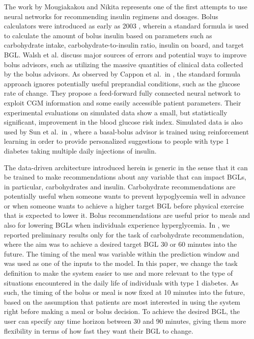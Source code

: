 \documentclass[graybox]{svmult}
\begin{document}

The work by Mougiakakou and Nikita \cite{stavroula:dtt} represents one of the first attempts to use neural networks for recommending insulin regimens and dosages. Bolus calculators were introduced as early as 2003 \cite{zisser:dtt08}, wherein a standard formula is used to calculate the amount of bolus insulin based on parameters such as carbohydrate intake, carbohydrate-to-insulin ratio, insulin on board, and target BGL. Walsh et al. \cite{walsh:jdst18} discuss major sources of errors and potential ways to improve bolus advisors, such as utilizing the massive quantities of clinical data collected by the bolus advisors. As observed by Cappon et al.~in \cite{cappon:jdst18}, the standard formula approach ignores potentially useful preprandial conditions, such as the glucose rate of change. They propose a feed-forward fully connected neural network to exploit CGM information and some easily accessible patient parameters. Their experimental evaluations on simulated data show a small, but statistically significant, improvement in the blood glucose risk index. Simulated data is also used by Sun et al.~in \cite{sun:jbhi19}, where a basal-bolus advisor is trained using reinforcement learning in order to provide personalized suggestions to people with type 1 diabetes taking multiple daily injections of insulin.

The data-driven architecture introduced herein is generic in the sense that it can be trained to make recommendations about any variable that can impact BGLs, in particular, carbohydrates and insulin.  Carbohydrate recommendations are potentially useful when someone wants to prevent hypoglycemia well in advance or when someone wants to achieve a higher target BGL before physical exercise that is expected to lower it.  Bolus recommendations are useful prior to meals and also for lowering BGLs when individuals experience hyperglycemia. In \cite{beauchamp:kdh20}, we reported preliminary results only for the task of carbohydrate recommendation, where the aim was to achieve a desired target BGL 30 or 60 minutes into the future. The timing of the meal was variable within the prediction window and was used as one of the inputs to the model. In this paper, we change the task definition to make the system easier to use and more relevant to the type of situations encountered in the daily life of individuals with type 1 diabetes. As such, the timing of the bolus or meal is now fixed at 10 minutes into the future, based on the assumption that patients are most interested in using the system right before making a meal or bolus decision. To achieve the desired BGL, the user can specify any time horizon between 30 and 90 minutes, giving them more flexibility in terms of how fast they want their BGL to change. 
\end{document}
